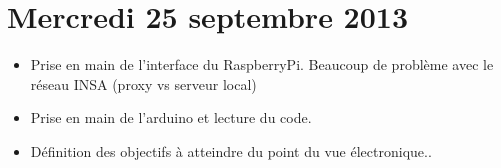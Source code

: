 	\section{Mercredi 25 septembre 2013} %
	\label{sec:mercredi_25_septembre_2013}
	\begin{itemize}
			\item Prise en main de l'interface du RaspberryPi. Beaucoup de problème avec le réseau INSA (proxy vs serveur local)
			\item Prise en main de l'arduino et lecture du code.
			\item Définition des objectifs à atteindre du point du vue électronique..
	\end{itemize}